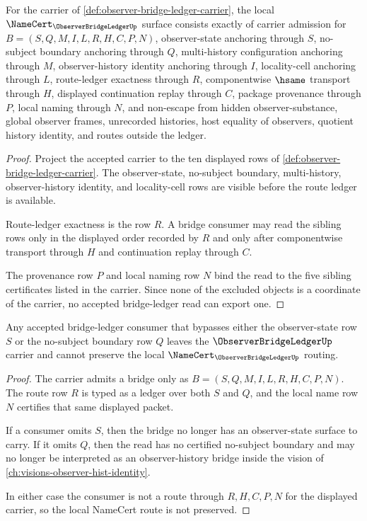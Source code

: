 \begin{theorem}
\label{thm:observer-bridge-ledger-namecert-obligations}
For the carrier of \autoref{def:observer-bridge-ledger-carrier}, the local $\NameCert_{\ObserverBridgeLedgerUp}$ surface consists exactly of carrier admission for $B=(S,Q,M,I,L,R,H,C,P,N)$, observer-state anchoring through $S$, no-subject boundary anchoring through $Q$, multi-history configuration anchoring through $M$, observer-history identity anchoring through $I$, locality-cell anchoring through $L$, route-ledger exactness through $R$, componentwise $\hsame$ transport through $H$, displayed continuation replay through $C$, package provenance through $P$, local naming through $N$, and non-escape from hidden observer-substance, global observer frames, unrecorded histories, host equality of observers, quotient history identity, and routes outside the ledger.
\end{theorem}
\begin{proof}
Project the accepted carrier to the ten displayed rows of \autoref{def:observer-bridge-ledger-carrier}. The observer-state, no-subject boundary, multi-history, observer-history identity, and locality-cell rows are visible before the route ledger is available.

Route-ledger exactness is the row $R$. A bridge consumer may read the sibling rows only in the displayed order recorded by $R$ and only after componentwise transport through $H$ and continuation replay through $C$.

The provenance row $P$ and local naming row $N$ bind the read to the five sibling certificates listed in the carrier. Since none of the excluded objects is a coordinate of the carrier, no accepted bridge-ledger read can export one.
\end{proof}

\begin{theorem}
\label{thm:observer-bridge-ledger-falsifiable-prediction}
Any accepted bridge-ledger consumer that bypasses either the observer-state row $S$ or the no-subject boundary row $Q$ leaves the $\ObserverBridgeLedgerUp$ carrier and cannot preserve the local $\NameCert_{\ObserverBridgeLedgerUp}$ routing.
\end{theorem}
\begin{proof}
The carrier admits a bridge only as $B=(S,Q,M,I,L,R,H,C,P,N)$. The route row $R$ is typed as a ledger over both $S$ and $Q$, and the local name row $N$ certifies that same displayed packet.

If a consumer omits $S$, then the bridge no longer has an observer-state surface to carry. If it omits $Q$, then the read has no certified no-subject boundary and may no longer be interpreted as an observer-history bridge inside the vision of \autoref{ch:visions-observer-hist-identity}.

In either case the consumer is not a route through $R,H,C,P,N$ for the displayed carrier, so the local NameCert route is not preserved.
\end{proof}

